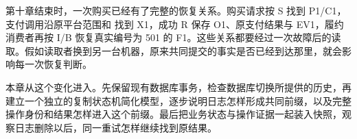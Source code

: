 \newcommand{\CElevenFigure}[3]{%
  \begin{figure}[htbp]
  \centering
  \begingroup
  \definecolor{Blue}{HTML}{315E76}
  \definecolor{Gold}{HTML}{A96B34}
  \tikzset{every node/.style={font=\small\sffamily,align=center},
    box/.style={draw=Blue,rounded corners=2pt,fill=blue!3,inner sep=6pt,
      text width=3.5cm,minimum height=.8cm},
    good/.style={box,draw=green!35!black,fill=green!4},
    warn/.style={box,draw=Gold,fill=orange!5},
    arr/.style={-{Stealth[length=2mm]},thick,draw=Blue},
    note/.style={font=\footnotesize\sffamily,align=center,text=black!75},
    lane/.style={draw=black!30,densely dashed},
    cell/.style={draw=Blue,minimum width=2.1cm,minimum height=.65cm,
      fill=blue!3,inner sep=3pt}}
  \resizebox{.98\linewidth}{!}{}
  \endgroup
  \caption{#2}\label{#3}
  \end{figure}}

第十章结束时，一次购买已经有了完整的恢复关系。购买请求按 S 找到 P1/C1，支付调用沿原平台范围和  找到 X1，成功 R 保存 O1、原支付结果与 EV1，履约消费者再按 I/B 恢复真实编号为 501 的 F1。这些关系都要经过一次故障后的读取。假如读取者换到另一台机器，原来共同提交的事实是否已经到达那里，就会影响每一次恢复判断。

本章从这个变化进入。先保留现有数据库事务，检查数据库切换所提供的历史，再建立一个独立的复制状态机简化模型，逐步说明日志怎样形成共同前缀，以及完整操作身份和结果怎样进入这个前缀。最后把业务状态与操作证据一起装入快照，观察日志删除以后，同一重试怎样继续找到原结果。

